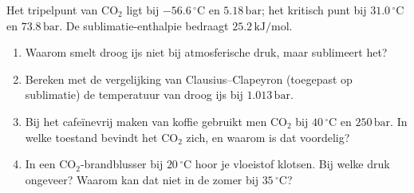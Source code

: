 \begin{oefening}
Het tripelpunt van \(\mathrm{CO_2}\) ligt bij \(-56.6\,^\circ\mathrm{C}\) en \(5.18\,\mathrm{bar}\); het kritisch punt bij \(31.0\,^\circ\mathrm{C}\) en \(73.8\,\mathrm{bar}\). De sublimatie-enthalpie bedraagt \(25.2\,\mathrm{kJ/mol}\).

\begin{enumerate}
\item[(a)]
  Waarom smelt droog ijs niet bij atmosferische druk, maar sublimeert het?
\item[(b)]
  Bereken met de vergelijking van Clausius--Clapeyron (toegepast op sublimatie) de temperatuur van droog ijs bij \(1.013\,\mathrm{bar}\).
\item[(c)]
  Bij het cafeïnevrij maken van koffie gebruikt men \(\mathrm{CO_2}\) bij \(40\,^\circ\mathrm{C}\) en \(250\,\mathrm{bar}\). In welke toestand bevindt het \(\mathrm{CO_2}\) zich, en waarom is dat voordelig?
\item[(d)]
  In een \(\mathrm{CO_2}\)-brandblusser bij \(20\,^\circ\mathrm{C}\) hoor je vloeistof klotsen. Bij welke druk ongeveer? Waarom kan dat niet in de zomer bij \(35\,^\circ\mathrm{C}\)?
\end{enumerate}
\end{oefening}
